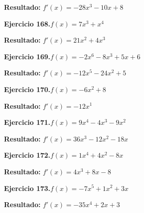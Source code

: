 \documentclass[10pt,a4paper]{article}
\begin{document}
\begin{solbox}
\textbf{Resultado:} \(\displaystyle f'(x) = -28x^{3} -10x +8\)
\end{solbox}

\begin{ejbox}
\textbf{Ejercicio 168.}\quad $f(x) = 7x^{3} + x^{4}$
\end{ejbox}

\begin{solbox}
\textbf{Resultado:} \(\displaystyle f'(x) = 21x^{2} + 4x^{3}\)
\end{solbox}

\newpage
\begin{ejbox}
\textbf{Ejercicio 169.}\quad $f(x) = -2x^{6} -8x^{3} +5x +6$
\end{ejbox}

\begin{solbox}
\textbf{Resultado:} \(\displaystyle f'(x) = -12x^{5} -24x^{2} +5\)
\end{solbox}

\begin{ejbox}
\textbf{Ejercicio 170.}\quad $f(x) = -6x^{2} +8$
\end{ejbox}

\begin{solbox}
\textbf{Resultado:} \(\displaystyle f'(x) = -12x^{1}\)
\end{solbox}

\begin{ejbox}
\textbf{Ejercicio 171.}\quad $f(x) = 9x^4 -4x^3 -9x^2$
\end{ejbox}

\begin{solbox}
\textbf{Resultado:} \(\displaystyle f'(x) = 36x^3 -12x^2 -18x\)
\end{solbox}

\newpage
\begin{ejbox}
\textbf{Ejercicio 172.}\quad $f(x) = 1x^{4} +4x^2 -8x$
\end{ejbox}

\begin{solbox}
\textbf{Resultado:} \(\displaystyle f'(x) = 4x^{3} +8x -8\)
\end{solbox}

\begin{ejbox}
\textbf{Ejercicio 173.}\quad $f(x) = -7x^{5} +1x^2 +3x$
\end{ejbox}

\begin{solbox}
\textbf{Resultado:} \(\displaystyle f'(x) = -35x^{4} +2x +3\)
\end{solbox}
\end{document}
